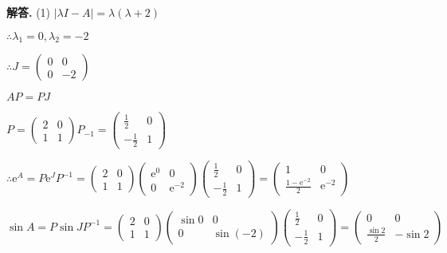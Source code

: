 \documentclass[12pt, a4paper, oneside]{ctexart}
\newenvironment{solution}{\par\noindent\textbf{解答. }}{\par}
\begin{document}
\begin{solution}
    (1) $|\lambda I-A|=\lambda(\lambda+2)$

    $\therefore \lambda_1=0, \lambda_2=-2$

    $\therefore J=\left(\begin{array}{ll}
        0 & 0 \\
        0 & -2
        \end{array}\right)$
    
    $AP=PJ$

    $P=\begin{pmatrix}
        2 & 0 \\
        1 & 1
    \end{pmatrix}
    P_{-1}=\begin{pmatrix}
        \frac{1}{2} & 0 \\
        -\frac{1}{2} & 1
    \end{pmatrix}$

    $\therefore \mathrm{e}^{A}=P\mathrm{e}^{J}P^{-1}=\begin{pmatrix}
        2 & 0 \\
        1 & 1
    \end{pmatrix}\begin{pmatrix}
        \mathrm{e}^{0} & 0 \\
        0 & \mathrm{e}^{-2}
    \end{pmatrix}\begin{pmatrix}
        \frac{1}{2} & 0 \\
        -\frac{1}{2} & 1
    \end{pmatrix}=\begin{pmatrix}
        1 & 0 \\
        \frac{1-\mathrm{e}^{-2}}{2} & \mathrm{e}^{-2}
    \end{pmatrix}
    $

    $\sin A=P\sin J P^{-1}=\begin{pmatrix}
        2 & 0 \\
        1 & 1   
    \end{pmatrix}\begin{pmatrix}
        \sin 0 & 0 \\
        0 & \sin (-2)
    \end{pmatrix}\begin{pmatrix}
        \frac{1}{2} & 0 \\
        -\frac{1}{2} & 1
    \end{pmatrix}=\begin{pmatrix}
        0 & 0 \\
        \frac{\sin 2}{2} & -\sin 2
    \end{pmatrix}$


\end{solution}
\end{document}
